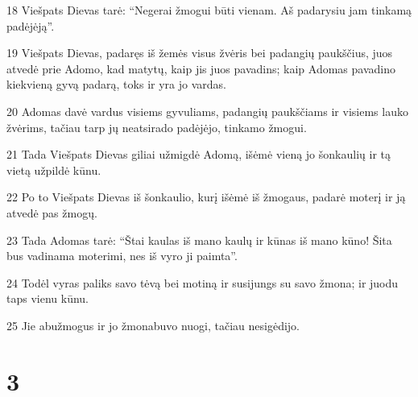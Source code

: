 \par 18 Viešpats Dievas tarė: “Negerai žmogui būti vienam. Aš padarysiu jam tinkamą padėjėją”. 
\par 19 Viešpats Dievas, padaręs iš žemės visus žvėris bei padangių paukščius, juos atvedė prie Adomo, kad matytų, kaip jis juos pavadins; kaip Adomas pavadino kiekvieną gyvą padarą, toks ir yra jo vardas. 
\par 20 Adomas davė vardus visiems gyvuliams, padangių paukščiams ir visiems lauko žvėrims, tačiau tarp jų neatsirado padėjėjo, tinkamo žmogui. 
\par 21 Tada Viešpats Dievas giliai užmigdė Adomą, išėmė vieną jo šonkaulių ir tą vietą užpildė kūnu. 
\par 22 Po to Viešpats Dievas iš šonkaulio, kurį išėmė iš žmogaus, padarė moterį ir ją atvedė pas žmogų. 
\par 23 Tada Adomas tarė: “Štai kaulas iš mano kaulų ir kūnas iš mano kūno! Šita bus vadinama moterimi, nes iš vyro ji paimta”. 
\par 24 Todėl vyras paliks savo tėvą bei motiną ir susijungs su savo žmona; ir juodu taps vienu kūnu. 
\par 25 Jie abu­žmogus ir jo žmona­buvo nuogi, tačiau nesigėdijo.



\chapter{3}

